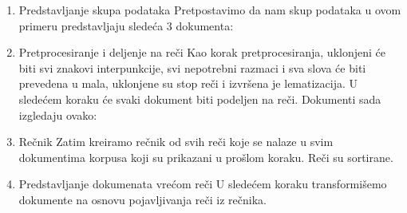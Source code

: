 \documentclass[12pt,oneside]{memoir}
\begin{document}
\begin{enumerate}
\item Predstavljanje skupa podataka
\newline
Pretpostavimo da nam skup podataka u ovom primeru predstavljaju sledeća 3 dokumenta:
\newline
\newline
\noindent{}
\newline
\newline
\item Pretprocesiranje i deljenje na reči
\newline
Kao korak pretprocesiranja,  uklonjeni će biti svi znakovi interpunkcije,  svi nepotrebni razmaci i sva slova će biti prevedena u mala,  uklonjene su stop reči i izvršena je lematizacija. U sledećem koraku će svaki dokument biti podeljen na reči.  Dokumenti sada izgledaju ovako:
\newline
\newline
\noindent{}
\newline
\newline
\item Rečnik
\newline
Zatim kreiramo rečnik od svih reči koje se nalaze u svim dokumentima korpusa koji su prikazani u prošlom koraku.  Reči su sortirane. 
\newline
\newline
\noindent{}
\newline
\newline
\item Predstavljanje dokumenata vrećom reči
\newline
U sledećem koraku transformišemo dokumente na osnovu pojavljivanja reči iz rečnika. 
\newline
\newline
\noindent\fbox{
    \parbox{\textwidth}{
}}
\end{enumerate}
\end{document}
